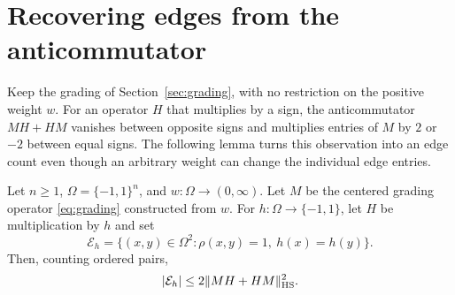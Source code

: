\section{Recovering edges from the anticommutator}\label{sec:edges}

Keep the grading of Section~\ref{sec:grading}, with no restriction on the
positive weight $w$. For an operator $H$ that multiplies by a sign, the
anticommutator $MH+HM$ vanishes between opposite signs and multiplies
entries of $M$ by $2$ or $-2$ between equal signs. The following lemma turns this observation into an edge
count even though an arbitrary weight can change the individual edge
entries.

\begin{lemma}\label{lem:edges}
Let $n\ge1$, $\Omega=\{-1,1\}^n$, and $w:\Omega\to(0,\infty)$.
Let $M$ be the centered grading operator \eqref{eq:grading} constructed
from $w$. For $h:\Omega\to\{-1,1\}$, let $H$ be multiplication by $h$
and set
\[
 \mathcal E_h=\{(x,y)\in\Omega^2:\rho(x,y)=1,\ h(x)=h(y)\}.
\]
Then, counting ordered pairs,
\begin{equation}\label{eq:edge-recovery}
 \lvert \mathcal E_h\rvert\le 2\lVert MH+HM\rVert_{\mathrm{HS}}^2.
\end{equation}
\end{lemma}

